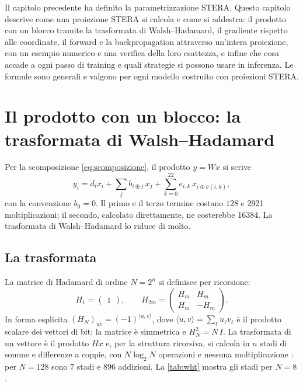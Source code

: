 Il capitolo precedente ha definito la parametrizzazione STERA. Questo capitolo descrive come una proiezione STERA si calcola e come si addestra: il prodotto con un blocco tramite la trasformata di Walsh--Hadamard, il gradiente rispetto alle coordinate, il forward e la backpropagation attraverso un'intera proiezione, con un esempio numerico e una verifica della loro esattezza, e infine che cosa accade a ogni passo di training e quali strategie si possono usare in inferenza. Le formule sono generali e valgono per ogni modello costruito con proiezioni STERA.

\section{Il prodotto con un blocco: la trasformata di Walsh--Hadamard}
\label{sec:wht}

Per la scomposizione \eqref{eq:scomposizione}, il prodotto $y=Wx$ si scrive
\begin{equation}
y_i = d_i x_i + \sum_{j} b_{i\oplus j}\,x_j + \sum_{k=0}^{22} e_{i,k}\,x_{i\oplus\sigma(i,k)},
\label{eq:gemv}
\end{equation}
con la convenzione $b_0=0$. Il primo e il terzo termine costano $128$ e \num{2921} moltiplicazioni; il secondo, calcolato direttamente, ne costerebbe \num{16384}. La trasformata di Walsh--Hadamard lo riduce di molto.

\subsection{La trasformata}
 La matrice di Hadamard di ordine $N=2^n$ si definisce per ricorsione:
\[
H_1 = \begin{pmatrix}1\end{pmatrix},\qquad
H_{2m} = \begin{pmatrix} H_m & H_m \\ H_m & -H_m \end{pmatrix}.
\]
In forma esplicita $(H_N)_{uv} = (-1)^{\langle u,v\rangle}$, dove $\langle u,v\rangle=\sum_\ell u_\ell v_\ell$ è il prodotto scalare dei vettori di bit; la matrice è simmetrica e $H_N^2 = N\,I$. La trasformata di un vettore è il prodotto $Hx$ e, per la struttura ricorsiva, si calcola in $n$ stadi di somme e differenze a coppie, con $N\log_2 N$ operazioni e nessuna moltiplicazione \cite{fino1976unified,beauchamp1984applications}: per $N=128$ sono $7$ stadi e $896$ addizioni. La \autoref{tab:wht} mostra gli stadi per $N=8$.

